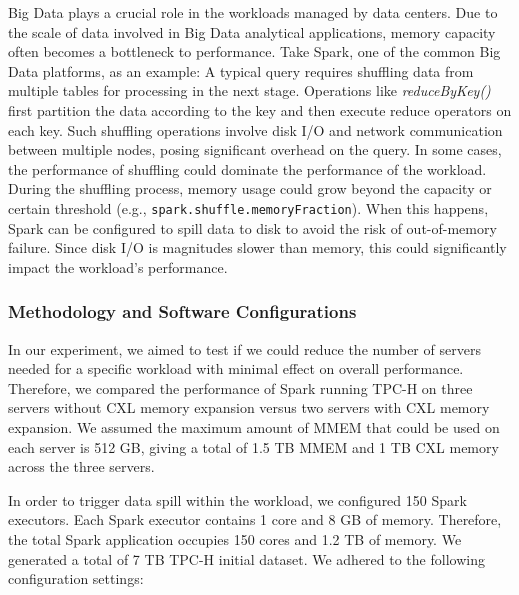 Big Data plays a crucial role in the workloads managed by data centers. Due to the scale of data involved in Big Data analytical applications, memory capacity often becomes a bottleneck to performance. Take Spark, one of the common Big Data platforms, as an example: A typical query requires shuffling data from multiple tables for processing in the next stage. Operations like \textit{reduceByKey()} first partition the data according to the key and then execute reduce operators on each key. Such shuffling operations involve disk I/O and network communication between multiple nodes, posing significant overhead on the query. In some cases, the performance of shuffling could dominate the performance of the workload. During the shuffling process, memory usage could grow beyond the capacity or certain threshold (e.g., \texttt{spark.shuffle.memoryFraction}). When this happens, Spark can be configured to spill data to disk to avoid the risk of out-of-memory failure. Since disk I/O is magnitudes slower than memory, this could significantly impact the workload's performance.

\subsubsection{Methodology and Software Configurations}

In our experiment, we aimed to test if we could reduce the number of servers needed for a specific workload with minimal effect on overall performance. Therefore, we compared the performance of Spark running TPC-H on three servers without CXL memory expansion versus two servers with CXL memory expansion. We assumed the maximum amount of MMEM that could be used on each server is 512 GB, giving a total of 1.5 TB MMEM and 1 TB CXL memory across the three servers.

In order to trigger data spill within the workload, we configured 150 Spark executors. Each Spark executor contains 1 core and 8 GB of memory. Therefore, the total Spark application occupies 150 cores and 1.2 TB of memory. We generated a total of 7 TB TPC-H initial dataset. We adhered to the following configuration settings:


